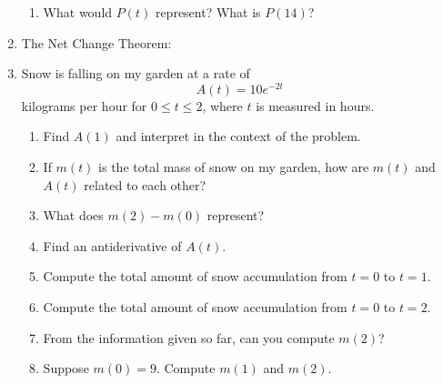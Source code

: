 \documentclass[11pt,fleqn]{article}
\begin{document}
\begin{enumerate}
\begin{enumerate}
\item What would $P(t)$ represent? What is $P(14)$?
\vfill
\end{enumerate}
\item The Net Change Theorem: 
\vspace{1in}
\newpage
\item Snow is falling on my garden at a rate of
\[
A(t) = 10 e^{-2 t}
\]
kilograms per hour for $0\le t\le 2$, where $t$ is measured in hours.
\begin{enumerate}
\item Find $A(1)$ and interpret in the context of the problem.
\vfill
\item If $m(t)$ is the total mass of snow on my garden, how are $m(t)$
and $A(t)$ related to each other?
\vfill
\item What does $m(2)-m(0)$ represent?
\vfill
\item Find an antiderivative of $A(t)$.
\vfill
\item Compute the total amount of snow accumulation from $t=0$ to $t=1$.
\vfill
\item Compute the total amount of snow accumulation from $t=0$ to $t=2$.
\vfill

\item From the information given so far, can you compute $m(2)$?
\vfill
\item Suppose $m(0)=9$.  Compute $m(1)$ and $m(2)$.
\vfill
\end{enumerate}
\end{enumerate}
\end{document}
